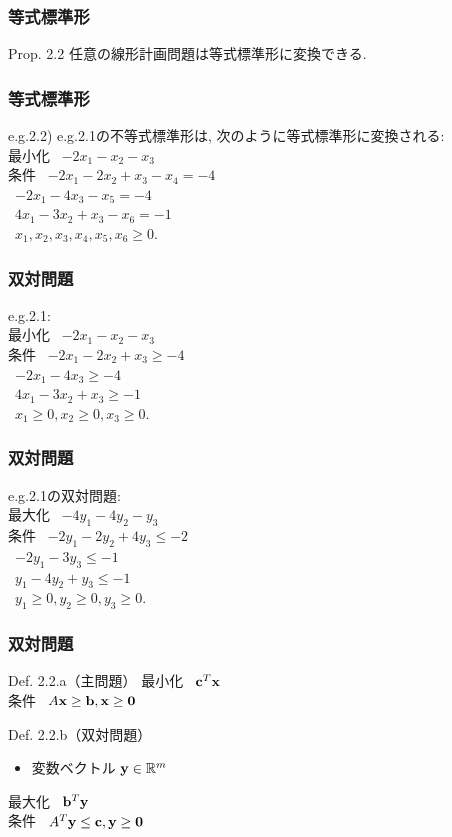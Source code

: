 \documentclass[unicode, 12pt, aspectratio = 43]{beamer}
\begin{document}
\begin{frame}[fragile]
	\frametitle{等式標準形}
	\begin{itembox}[l]{Prop. 2.2}
		任意の線形計画問題は等式標準形に変換できる.
	\end{itembox}
\end{frame}

\begin{frame}[fragile]
	\frametitle{等式標準形}
	e.g.2.2) e.g.2.1の不等式標準形は, 次のように等式標準形に変換される: \\
	最小化 \ $-2x_1 - x_2 - x_3$ \\
	条件 \ $-2x_1 - 2x_2 + x_3 - x_4 = -4$ \\
	\   $-2x_1 - 4x_3  - x_5 = -4$ \\
	\   $4x_1 - 3x_2 + x_3 - x_6 = -1$ \\
	\   $x_1, x_2, x_3, x_4, x_5, x_6 \ge 0.$
\end{frame}

\begin{frame}[fragile]
	\frametitle{双対問題}
	e.g.2.1: \\
	最小化 \ $-2x_1 - x_2 - x_3$ \\
	条件 \ $-2x_1 - 2x_2 + x_3 \ge -4$ \\
	\   $-2x_1 - 4x_3 \ge -4$ \\
	\   $4x_1 - 3x_2 + x_3 \ge -1$ \\
	\   $x_1 \ge 0, x_2 \ge 0, x_3 \ge 0.$
\end{frame}

\begin{frame}[fragile]
	\frametitle{双対問題}
	e.g.2.1の双対問題: \\
	最大化 \ $-4y_1 - 4y_2 - y_3$ \\
	条件 \ $-2y_1 - 2y_2 + 4y_3 \le -2$ \\
	\   $-2y_1 - 3y_3 \le -1$ \\
	\   $y_1 - 4y_2 + y_3 \le -1$ \\
	\   $y_1 \ge 0, y_2 \ge 0, y_3 \ge 0.$
\end{frame}

\begin{frame}[fragile]
	\frametitle{双対問題}
	\begin{itembox}[l]{Def. 2.2.a（主問題）}
		最小化 \ ${\bf c}^T {\bf x}$ \\
		条件 \ $A{\bf x} \ge {\bf b}, {\bf x} \ge {\bf 0}$
	\end{itembox}
	\begin{itembox}[l]{Def. 2.2.b（双対問題）}
	\begin{itemize}
		\item 変数ベクトル ${\bf y} \in \mathbb{R}^m$
	\end{itemize}
		最大化 \ ${\bf b}^T {\bf y}$ \\
		条件 \ $A^T{\bf y} \le {\bf c}, {\bf y} \ge {\bf 0}$
	\end{itembox}
\end{frame}
\end{document}
